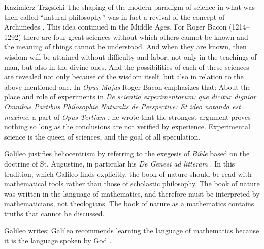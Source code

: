 \begin{artengenv}{Kazimierz Trzęsicki}
The shaping of the modern paradigm of science in what was then called ``natural philosophy'' was in fact a revival of the concept of Archimedes \parencite[pp.71, 77] {Heller2013}. This idea continued in the Middle Ages. For Roger Bacon (1214--1292) there are four great sciences without which others cannot be known and the meaning of things cannot be understood. And when they are known, then wisdom will be attained without difficulty and labor, not only in the teachings of man, but also in the divine ones. And the possibilities of each of these sciences  are revealed not only because of the wisdom itself, but also in relation to the above-mentioned one. In  \emph{Opus Majus} \parencite*[Pars Quarta, Distinctio Prima, Capitulum I]{Bacon2010a} Roger Bacon emphasizes that:
About the place and role of experiments in \emph{De scientia experimentorum: que dicitur dignior Omnibus Partibus Philosophie Naturalis de Perspective: Et ideo notanda est maxime}, a part of \emph{Opus Tertium} \parencite*{Bacon1912}, he wrote that the strongest argument proves nothing so long as the conclusions are not verified by experience. Experimental science is the queen of sciences, and the goal of all speculation.


Galileo justifies heliocentrism by referring to the exegesis of \emph {Bible} based on the doctrine of St. Augustine, in particular his \emph{De Genesi ad litteram}
\parencites{galileo_galilei_letter_1615}[cf.][p.73]{Sibley2013}. In this tradition, which Galileo finds explicitly, the book of nature should be read with mathematical tools rather than those of scholastic philosophy. The book of nature was written in the language of mathematics, and therefore must be interpreted by mathematicians, not theologians. The book of nature as a mathematics contains truths that cannot be discussed.

\pagebreak
Galileo \parencite*[p.4]{Galileo1960} writes:  Galileo recommends learning the language of mathematics because it is the language spoken by God \parencite{Wouk2010,Strogatz2019}. 


\end{artengenv}
